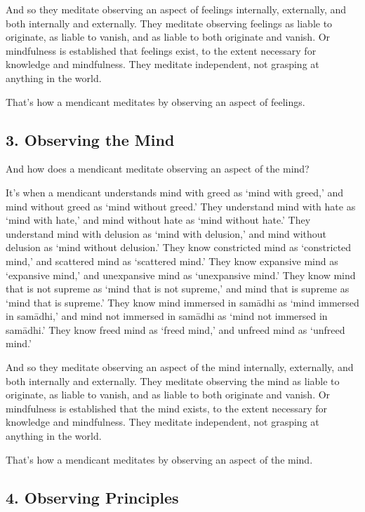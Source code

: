 \documentclass[12pt,openany]{book}%
\begin{document}
And so they meditate observing an aspect of feelings internally, externally, and both internally and externally. They meditate observing feelings as liable to originate, as liable to vanish, and as liable to both originate and vanish. Or mindfulness is established that feelings exist, to the extent necessary for knowledge and mindfulness. They meditate independent, not grasping at anything in the world. 

That’s how a mendicant meditates by observing an aspect of feelings. 

\subsection*{3. Observing the Mind }

And how does a mendicant meditate observing an aspect of the mind? 

It’s when a mendicant understands mind with greed as ‘mind with greed,’ and mind without greed as ‘mind without greed.’ They understand mind with hate as ‘mind with hate,’ and mind without hate as ‘mind without hate.’ They understand mind with delusion as ‘mind with delusion,’ and mind without delusion as ‘mind without delusion.’ They know constricted mind as ‘constricted mind,’ and scattered mind as ‘scattered mind.’ They know expansive mind as ‘expansive mind,’ and unexpansive mind as ‘unexpansive mind.’ They know mind that is not supreme as ‘mind that is not supreme,’ and mind that is supreme as ‘mind that is supreme.’ They know mind immersed in \textsanskrit{samādhi} as ‘mind immersed in \textsanskrit{samādhi},’ and mind not immersed in \textsanskrit{samādhi} as ‘mind not immersed in \textsanskrit{samādhi}.’ They know freed mind as ‘freed mind,’ and unfreed mind as ‘unfreed mind.’ 

And so they meditate observing an aspect of the mind internally, externally, and both internally and externally. They meditate observing the mind as liable to originate, as liable to vanish, and as liable to both originate and vanish. Or mindfulness is established that the mind exists, to the extent necessary for knowledge and mindfulness. They meditate independent, not grasping at anything in the world. 

That’s how a mendicant meditates by observing an aspect of the mind. 

\subsection*{4. Observing Principles }
\end{document}
